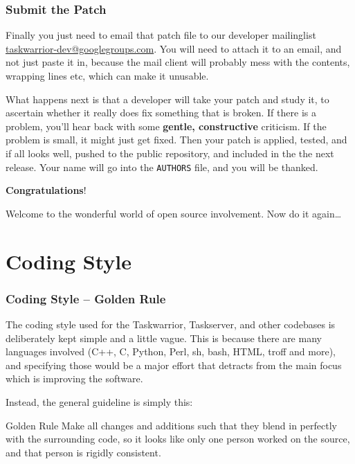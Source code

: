 \documentclass[t,handout]{beamer}
\begin{document}
\begin{frame}[fragile]\frametitle{Submit the Patch}
    Finally you just need to email that patch file to our developer mailinglist \href{mailto:taskwarrior-dev@googlegroups.com}{taskwarrior-dev@googlegroups.com}. You will need to attach it to an email, and not just paste it in, because the mail client will probably mess with the contents, wrapping lines etc, which can make it unusable.

    What happens next is that a developer will take your patch and study it, to ascertain whether it really does fix something that is broken. If there is a problem, you'll hear back with some \textbf{gentle, constructive} criticism. If the problem is small, it might just get fixed. Then your patch is applied, tested, and if all looks well, pushed to the public repository, and included in the the next release. Your name will go into the \verb=AUTHORS= file, and you will be thanked.

    \textbf{Congratulations}!

    Welcome to the wonderful world of open source involvement. Now do it again\ldots
\end{frame}

\section{Coding Style}

\begin{frame}[fragile]\frametitle{Coding Style -- Golden Rule}
    \vfill
    The coding style used for the Taskwarrior, Taskserver, and other codebases is deliberately kept simple and a little vague. This is because there are many languages involved (C++, C, Python, Perl, sh, bash, HTML, troff and more), and specifying those would be a major effort that detracts from the main focus which is improving the software.

    Instead, the general guideline is simply this:

    \begin{alertblock}{Golden Rule}
        Make all changes and additions such that they blend in perfectly with the surrounding code, so it looks like only one person worked on the source, and that person is rigidly consistent.
    \end{alertblock}

\end{frame}
\end{document}
